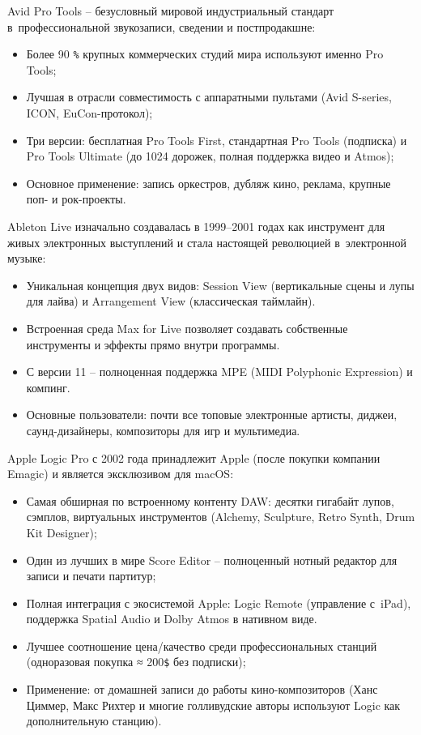 \documentclass{ou}
\begin{document}
Avid Pro Tools -- безусловный мировой индустриальный стандарт в~профессиональной звукозаписи, сведении и постпродакшне:
\begin{itemize}[label=-, leftmargin=0em, itemindent=3.35em, nosep]
\item Более 90 \verb|%| крупных коммерческих студий мира используют именно Pro Tools;
\item Лучшая в отрасли совместимость с аппаратными пультами (Avid S-series, ICON, EuCon-протокол);
\item Три версии: бесплатная Pro Tools First, стандартная Pro Tools (подписка) и Pro Tools Ultimate (до 1024 дорожек, полная поддержка видео и Atmos);
\item Основное применение: запись оркестров, дубляж кино, реклама, крупные поп- и рок-проекты.
\end{itemize}

Ableton Live изначально создавалась в 1999–2001 годах как инструмент для живых электронных выступлений и стала настоящей революцией в~электронной музыке:
\begin{itemize}[label=-, leftmargin=0em, itemindent=3.35em, nosep]
\item Уникальная концепция двух видов: Session View (вертикальные сцены и лупы для лайва) и Arrangement View (классическая таймлайн).
\item Встроенная среда Max for Live позволяет создавать собственные инструменты и эффекты прямо внутри программы.
\item С версии 11 -- полноценная поддержка MPE (MIDI Polyphonic Expression) и компинг.
\item Основные пользователи: почти все топовые электронные артисты, диджеи, саунд-дизайнеры, композиторы для игр и мультимедиа.
\end{itemize}

Apple Logic Pro с 2002 года принадлежит Apple (после покупки компании Emagic) и является эксклюзивом для macOS:
\begin{itemize}[label=-, leftmargin=0em, itemindent=3.35em, nosep]
\item Самая обширная по встроенному контенту DAW: десятки гигабайт лупов, сэмплов, виртуальных инструментов (Alchemy, Sculpture, Retro Synth, Drum Kit Designer);
\item Один из лучших в мире Score Editor -- полноценный нотный редактор для записи и печати партитур;
\item Полная интеграция с экосистемой Apple: Logic Remote (управление с~iPad), поддержка Spatial Audio и Dolby Atmos в нативном виде.
\item Лучшее соотношение цена/качество среди профессиональных станций (одноразовая покупка ≈ 200\verb|$| без подписки);
\item Применение: от домашней записи до работы кино-композиторов (Ханс Циммер, Макс Рихтер и многие голливудские авторы используют Logic как дополнительную станцию).
\end{itemize}
\end{document}
